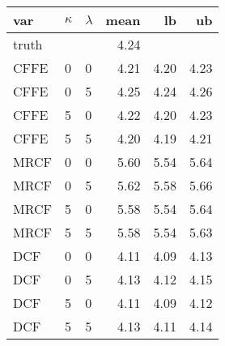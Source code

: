 \begin{tabular}{lllrrr}
  \hline
var & $\kappa$ & $\lambda$ & mean & lb & ub \\ 
  \hline
truth &  &  & 4.24 &  &  \\ 
  CFFE  & 0 & 0 & 4.21 & 4.20 & 4.23 \\ 
  CFFE  & 0 & 5 & 4.25 & 4.24 & 4.26 \\ 
  CFFE  & 5 & 0 & 4.22 & 4.20 & 4.23 \\ 
  CFFE  & 5 & 5 & 4.20 & 4.19 & 4.21 \\ 
  MRCF  & 0 & 0 & 5.60 & 5.54 & 5.64 \\ 
  MRCF  & 0 & 5 & 5.62 & 5.58 & 5.66 \\ 
  MRCF  & 5 & 0 & 5.58 & 5.54 & 5.64 \\ 
  MRCF  & 5 & 5 & 5.58 & 5.54 & 5.63 \\ 
  DCF  & 0 & 0 & 4.11 & 4.09 & 4.13 \\ 
  DCF  & 0 & 5 & 4.13 & 4.12 & 4.15 \\ 
  DCF  & 5 & 0 & 4.11 & 4.09 & 4.12 \\ 
  DCF  & 5 & 5 & 4.13 & 4.11 & 4.14 \\ 
   \hline
\end{tabular}
